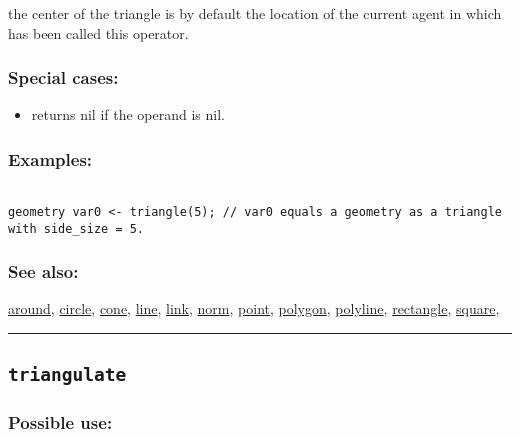 \documentclass[]{book}
\providecommand{\tightlist}{%
  \setlength{\itemsep}{0pt}\setlength{\parskip}{0pt}}
\theoremstyle{definition}
\theoremstyle{definition}
\theoremstyle{definition}
\theoremstyle{remark}
\begin{document}
the center of the triangle is by default the location of the current
agent in which has been called this operator.

\subsubsection{Special cases:}\label{special-cases-140}

\begin{itemize}
\tightlist
\item
  returns nil if the operand is nil.
\end{itemize}

\subsubsection{Examples:}\label{examples-370}

\begin{verbatim}
 
geometry var0 <- triangle(5); // var0 equals a geometry as a triangle with side_size = 5.
\end{verbatim}

\subsubsection{See also:}\label{see-also-211}

\href{OperatorsAA\#around}{around}, \href{OperatorsBC\#circle}{circle},
\href{OperatorsBC\#cone}{cone}, \href{OperatorsIM\#line}{line},
\href{OperatorsIM\#link}{link}, \href{OperatorsNR\#norm}{norm},
\href{OperatorsNR\#point}{point}, \href{OperatorsNR\#polygon}{polygon},
\href{OperatorsNR\#polyline}{polyline},
\href{OperatorsNR\#rectangle}{rectangle},
\href{OperatorsSZ\#square}{square},

\begin{center}\rule{0.5\linewidth}{\linethickness}\end{center}

\subsection{\texorpdfstring{\texttt{triangulate}}{triangulate}}\label{triangulate}

\subsubsection{Possible use:}\label{possible-use-534}
\end{document}
